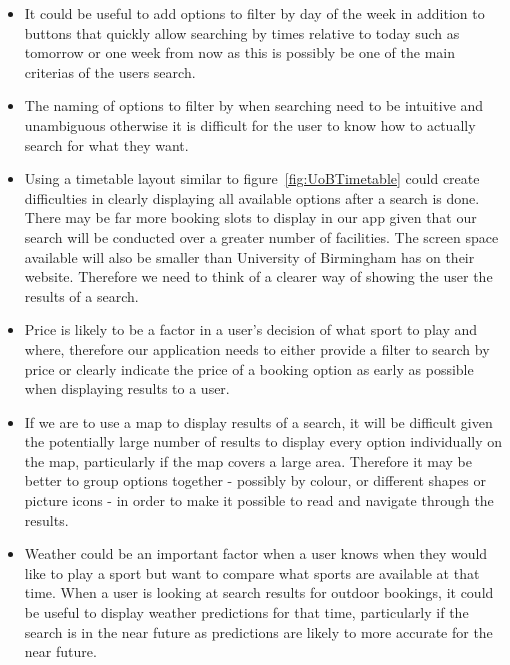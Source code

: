 \begin{itemize}
        \item It could be useful to add options to filter by day of the week in addition to buttons that quickly allow searching by times relative to today such as tomorrow or one week from now as this is possibly be one of the main criterias of the users search. 
        \item The naming of options to filter by when searching need to be intuitive and unambiguous otherwise it is difficult  for the user to know how to actually search for what they want.
        \item Using a timetable layout similar to figure~\ref{fig:UoBTimetable} could create difficulties in clearly displaying all available options after a search is done. There may be far more booking slots to display in our app given that our search will be conducted over a greater number of facilities. The screen space available will also be smaller than University of Birmingham has on their website. Therefore we need to think of a clearer way of showing the user the results of a search.
        \item Price is likely to be a factor in a user's decision of what sport to play and where, therefore our application needs to either provide a filter to search by price or clearly indicate the price of a booking option as early as possible when displaying results to a user.
        \item If we are to use a map to display results of a search, it will be difficult given the potentially large number of results to display every option individually on the map, particularly if the map covers a large area. Therefore it may be better to group options together - possibly by colour, or different shapes or picture icons - in order to make it possible to read and navigate through the results.
        \item Weather could be an important factor when a user knows when they would like to play a sport but want to compare what sports are available at that time. When a user is looking at search results for outdoor bookings, it could be useful to display weather predictions for that time, particularly if the search is in the near future as predictions are likely to more accurate for the near future.
\end{itemize}
